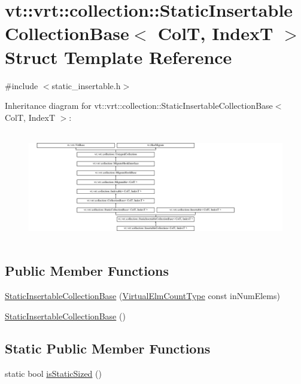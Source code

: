 \hypertarget{structvt_1_1vrt_1_1collection_1_1_static_insertable_collection_base}{}\section{vt\+:\+:vrt\+:\+:collection\+:\+:Static\+Insertable\+Collection\+Base$<$ ColT, IndexT $>$ Struct Template Reference}
\label{structvt_1_1vrt_1_1collection_1_1_static_insertable_collection_base}


{\ttfamily \#include $<$static\+\_\+insertable.\+h$>$}

Inheritance diagram for vt\+:\+:vrt\+:\+:collection\+:\+:Static\+Insertable\+Collection\+Base$<$ ColT, IndexT $>$\+:\begin{figure}[H]
\begin{center}
\leavevmode
\includegraphics[height=4.873803cm]{structvt_1_1vrt_1_1collection_1_1_static_insertable_collection_base}
\end{center}
\end{figure}
\subsection*{Public Member Functions}
\begin{DoxyCompactItemize}
\item 
\hyperlink{structvt_1_1vrt_1_1collection_1_1_static_insertable_collection_base_ae200b0f2d6c9d420b6937645757b6f8f}{Static\+Insertable\+Collection\+Base} (\hyperlink{namespacevt_ac115668758184050beff7a9281a2c490}{Virtual\+Elm\+Count\+Type} const in\+Num\+Elems)
\item 
\hyperlink{structvt_1_1vrt_1_1collection_1_1_static_insertable_collection_base_af7191e42a5e15d867b02ff1b26c82ec6}{Static\+Insertable\+Collection\+Base} ()
\end{DoxyCompactItemize}
\subsection*{Static Public Member Functions}
\begin{DoxyCompactItemize}
\item 
static bool \hyperlink{structvt_1_1vrt_1_1collection_1_1_static_insertable_collection_base_aa6176de291ff3080623c88993f2fbd4d}{is\+Static\+Sized} ()
\end{DoxyCompactItemize}

